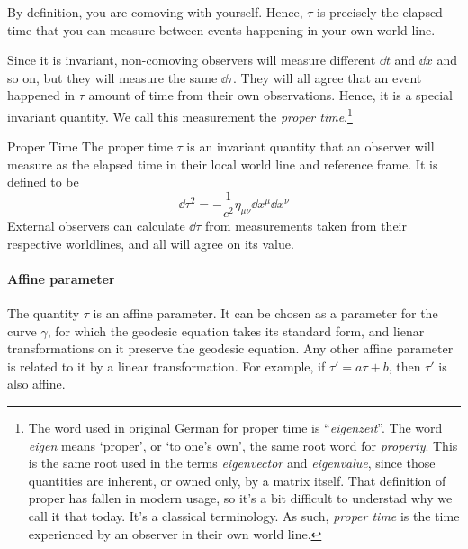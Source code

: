 		By definition, you are comoving with yourself. Hence, $\tau$
		is precisely the elapsed time that you can measure between events happening 
		in your own world line.

		Since it is invariant, non-comoving observers will measure different 
		$\dd{t}$ and  $\dd{x}$ and so on, but they will measure the same $\dd{\tau}$.
		They will all agree that an event happened in $\tau$ amount of time from
		their own observations.
		Hence, it is a special invariant quantity.
		We call this measurement the \textit{proper time}.\footnote{The word used in original German 
		for proper time is ``\textit{eigenzeit}''. The word \textit{eigen} means `proper', or `to one's own',
		the same root word for \textit{property}. This is the same root used in the terms \textit{eigenvector} and
		\textit{eigenvalue}, since those quantities are inherent, or owned only, by a matrix itself. That definition of proper 
		has fallen in modern usage, so it's a bit difficult to understad why we call it that today. It's a classical
		terminology. As such, \textit{proper time} is the time experienced by an observer in their own world line.}

		\begin{definition}{Proper Time}
		    The proper time $\tau$ is an invariant quantity
			that an
			observer will measure as the elapsed time in their local world line
			and reference frame.
			It is defined to be
			\begin{equation}
				\label{eq:proper-time}
				\dd{\tau}^2 = -
				\frac{1}{c^2} \eta_{\mu\nu}\dd{x^\mu}\dd{x^\nu} 
			\end{equation}
			External observers can calculate $\dd{\tau}$
			from measurements taken from their respective worldlines, and
			all will agree on its value.
		\end{definition}

		\paragraph{Affine parameter}

		The quantity $\tau$ is an affine parameter. It can be chosen
		as a parameter for the curve $\gamma$, for which the geodesic
		equation takes its standard form, and lienar transformations on
		it preserve the geodesic equation. 
		Any other affine parameter is related to it by a linear transformation.
		For example, if  
		$
			\tau' = 	a \tau + b
		$,
		then $\tau'$ is also affine.
		


